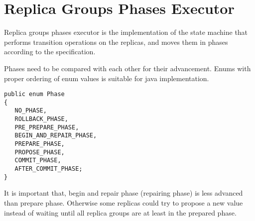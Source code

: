 
\section{Replica Groups Phases Executor}
Replica groups phases executor is the implementation of the state machine that performs transition operations on the replicas, and moves them in phases according to the specification.

Phases need to be compared with each other for their advancement. Enums with proper ordering of enum values is suitable for java implementation.

\begin{lstlisting}[style=outcode,label={lst:phaseEnum},caption={Phase enum}]
public enum Phase
{
   NO_PHASE,
   ROLLBACK_PHASE,
   PRE_PREPARE_PHASE,
   BEGIN_AND_REPAIR_PHASE,
   PREPARE_PHASE,
   PROPOSE_PHASE,
   COMMIT_PHASE,
   AFTER_COMMIT_PHASE;
}
\end{lstlisting}

It is important that, begin and repair phase (repairing phase) is less advanced than prepare phase. Otherwise some replicas could try to propose a new value instead of waiting until all replica groups are at least in the prepared phase.

